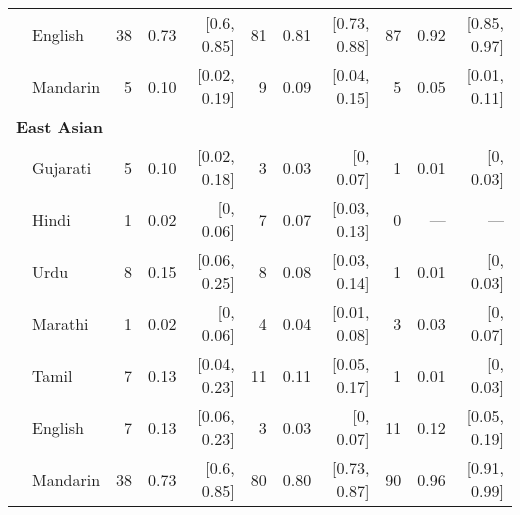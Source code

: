 \begin{table}[t]
\begin{footnotesize}
\begin{tabular}{p{.1in}lrrrrrrrrr}
 & English & 38 & 0.73 & [0.6, 0.85] & 81 & 0.81 & [0.73, 0.88] & 87 & 0.92 & [0.85, 0.97]\\

 & Mandarin & 5 & 0.10 & [0.02, 0.19] & 9 & 0.09 & [0.04, 0.15] & 5 & 0.05 & [0.01, 0.11]\\

\midrule
\multicolumn{11}{l}{\textbf{East Asian}}\\
& Gujarati & 5 & 0.10 & [0.02, 0.18] & 3 & 0.03 & [0, 0.07] & 1 & 0.01 & [0, 0.03]\\

 & Hindi & 1 & 0.02 & [0, 0.06] & 7 & 0.07 & [0.03, 0.13] & 0 & --- & ---\\

 & Urdu & 8 & 0.15 & [0.06, 0.25] & 8 & 0.08 & [0.03, 0.14] & 1 & 0.01 & [0, 0.03]\\

 & Marathi & 1 & 0.02 & [0, 0.06] & 4 & 0.04 & [0.01, 0.08] & 3 & 0.03 & [0, 0.07]\\

 & Tamil & 7 & 0.13 & [0.04, 0.23] & 11 & 0.11 & [0.05, 0.17] & 1 & 0.01 & [0, 0.03]\\

 & English & 7 & 0.13 & [0.06, 0.23] & 3 & 0.03 & [0, 0.07] & 11 & 0.12 & [0.05, 0.19]\\

& Mandarin & 38 & 0.73 & [0.6, 0.85] & 80 & 0.80 & [0.73, 0.87] & 90 & 0.96 & [0.91, 0.99]\\

\bottomrule
\end{tabular}
\end{footnotesize}
\end{table}